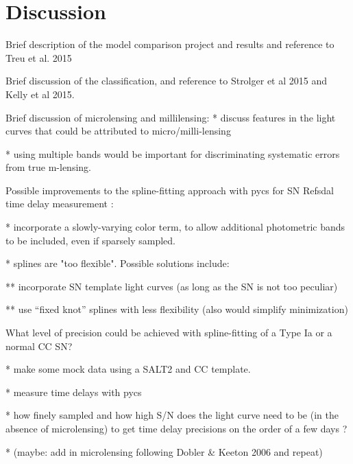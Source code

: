 \section{Discussion}\label{sec:Discussion}

Brief description of the model comparison project and results and reference to Treu et al. 2015

Brief discussion of the classification, and reference to Strolger et al 2015 and Kelly et al 2015.

Brief discussion of microlensing and millilensing: 
* discuss features in the light curves that could be attributed to micro/milli-lensing

* using multiple bands would be important for discriminating systematic errors from true m-lensing. 

Possible improvements to the spline-fitting approach with pycs for SN Refsdal time delay measurement :

* incorporate a slowly-varying color term, to allow additional photometric bands to be included, even if sparsely sampled. 

* splines are "too flexible". Possible solutions include:

** incorporate SN template light curves (as long as the SN is not too peculiar)

** use ``fixed knot'' splines with less flexibility (also would simplify minimization)

What level of precision could be achieved with spline-fitting of a Type Ia or a normal CC SN? 

  * make some mock data using a SALT2 and CC template.

  * measure time delays with pycs

  * how finely sampled and how high S/N does the light curve need to be (in the absence of microlensing) to get time delay precisions on the order of a few days ?

  * (maybe: add in microlensing following Dobler \& Keeton 2006 and repeat) 




